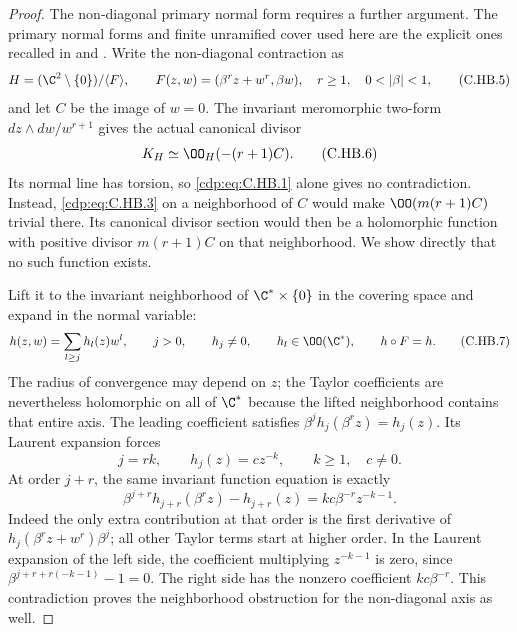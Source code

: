 \begin{proof}
The non-diagonal primary normal form
requires a further argument. The primary
normal forms and finite unramified cover
used here are the explicit ones recalled
in \cite[Theorem~2.1]{Khaled2024Hopf}
and \cite[\S1.1]{Nakamura2008VII}.
Write the non-diagonal contraction
as
\[
 H=(\C^2\setminus\{0\})/\langle F\rangle,
 \qquad F(z,w)=(\beta^r z+w^r,\beta w),
                  \quad r\ge1,\quad0<|\beta|<1,
                                                               \tag{C.HB.5}\label{cdp:eq:C.HB.5}
\]
and let $C$ be the image of $w=0$.
The invariant meromorphic two-form
$dz\wedge dw/w^{r+1}$ gives the actual
canonical divisor
\[
                         K_H\simeq\OO_H(-(r+1)C).
                                                               \tag{C.HB.6}\label{cdp:eq:C.HB.6}
\]
Its normal line has torsion, so \eqref{cdp:eq:C.HB.1}
alone gives no contradiction. Instead,
\eqref{cdp:eq:C.HB.3} on a neighborhood of $C$ would
make $\OO(m(r+1)C)$ trivial there.
Its canonical divisor section would
then be a holomorphic function with
positive divisor $m(r+1)C$ on that
neighborhood. We show directly that
no such function exists.

Lift it to the invariant neighborhood
of $\C^*\times\{0\}$ in the covering
space and expand in the normal variable:
\[
 h(z,w)=\sum_{l\ge j}h_l(z)w^l,
       \qquad j>0,\qquad h_j\ne0,
       \qquad h_l\in\OO(\C^*),
       \qquad h\circ F=h.                           \tag{C.HB.7}\label{cdp:eq:C.HB.7}
\]
The radius of convergence may depend
on $z$; the Taylor coefficients are
nevertheless holomorphic on all of
$\C^*$ because the lifted neighborhood
contains that entire axis. The leading
coefficient satisfies
$\beta^j h_j(\beta^r z)=h_j(z)$.
Its Laurent expansion forces
\[
                      j=rk,\qquad
                      h_j(z)=c z^{-k},
                      \qquad k\ge1,\quad c\ne0.
                                                               \tag{C.HB.8}\label{cdp:eq:C.HB.8}
\]
At order $j+r$, the same invariant
function equation is exactly
\[
 \beta^{j+r}h_{j+r}(\beta^r z)-h_{j+r}(z)
                    =k c\beta^{-r}z^{-k-1}.          \tag{C.HB.9}\label{cdp:eq:C.HB.9}
\]
Indeed the only extra contribution
at that order is the first derivative
of $h_j(\beta^r z+w^r)\beta^j$;
all other Taylor terms start at
higher order. In the Laurent
expansion of the left side, the
coefficient multiplying $z^{-k-1}$
is zero, since
$\beta^{j+r+r(-k-1)}-1=0$.
The right side has the nonzero
coefficient $k c\beta^{-r}$.
This contradiction proves the
neighborhood obstruction for
the non-diagonal axis as well.


\end{proof}

